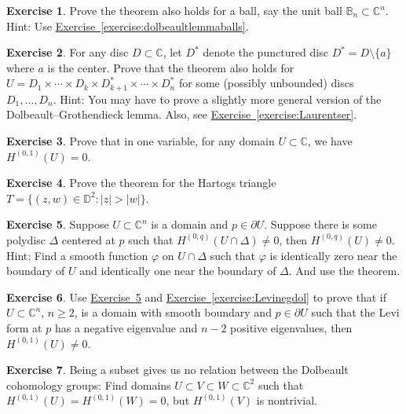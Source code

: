 \documentclass[12pt,openany]{book}
\newcommand{\sabs}[1]{\lvert {#1} \rvert}
\newcommand{\C}{{\mathbb{C}}}
\newcommand{\D}{{\mathbb{D}}}
\newcommand{\bB}{{\mathbb{B}}}
\theoremstyle{plain}
\theoremstyle{remark}
\theoremstyle{definition}
\newenvironment{exbox}{%
    \def\FrameCommand{\vrule width 1pt \relax\hspace{10pt}}%
    \MakeFramed{\advance\hsize-\width\FrameRestore}%
}{%
    \endMakeFramed
}
\theoremstyle{exercise}
\newtheorem{exercise}{Exercise}[section]
\theoremstyle{example}
\newcommand{\exerciseref}[1]{\hyperref[#1]{Exercise~\ref*{#1}}}
\begin{document}
\begin{exbox}
\begin{exercise}
Prove the theorem also holds for a ball, say the unit ball $\bB_n \subset
\C^n$.  Hint: Use \exerciseref{exercise:dolbeaultlemmaballs}.
\end{exercise}

\begin{exercise}
For any disc $D \subset \C$, let $D^*$ denote the punctured disc
$D^* = D \setminus \{ a \}$ where $a$ is the center.
Prove that the theorem also holds for
$U = D_1 \times \cdots \times D_k \times D_{k+1}^* \times
\cdots \times D_n^*$ for some (possibly unbounded) discs
$D_1,\ldots,D_n$.
Hint: You may have to prove a slightly more general version of the
Dolbeault--Grothendieck lemma.
Also, see \exerciseref{exercise:Laurentser}.
\end{exercise}

\begin{exercise}
Prove that in one variable, for any domain $U \subset \C$, we have
$H^{(0,1)}(U) = 0$.
\end{exercise}

\begin{exercise}
Prove the theorem for the Hartogs triangle
$T = \bigl\{ (z,w) \in \D^{2} : \sabs{z} > \sabs{w} \bigr\}$.
\end{exercise}

\begin{exercise} \label{exercise:dollocal}
Suppose $U \subset \C^n$ is a domain and $p \in \partial U$.  Suppose there
is some polydisc $\Delta$ centered at $p$ such that
$H^{(0,q)}(U \cap \Delta) \neq 0$, then $H^{(0,q)}(U) \neq 0$.
Hint:  Find a smooth function $\varphi$ on $U \cap \Delta$ such that
$\varphi$ is identically zero near the boundary of $U$ and identically one
near the boundary of $\Delta$.  And use the theorem.
\end{exercise}

\begin{exercise}
Use \exerciseref{exercise:dollocal} and
\exerciseref{exercise:Levinegdol} to prove that if
$U \subset \C^n$, $n \geq 2$, is a domain with smooth boundary and $p \in \partial U$
such that the Levi form at $p$ has a negative eigenvalue and $n-2$ positive
eigenvalues, then $H^{(0,1)}(U) \neq 0$.
\end{exercise}

\begin{exercise}
Being a subset gives us no relation between the Dolbeault
cohomology groups:  Find domains $U \subset V \subset W \subset \C^2$
such that
$H^{(0,1)}(U) = H^{(0,1)}(W) = 0$, but $H^{(0,1)}(V)$ is nontrivial.
\end{exercise}
\end{exbox}
\end{document}
